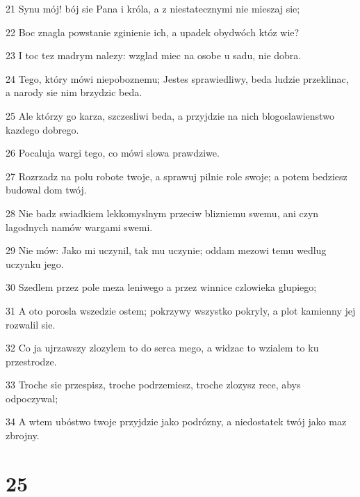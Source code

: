 \par 21 Synu mój! bój sie Pana i króla, a z niestatecznymi nie mieszaj sie;
\par 22 Boc znagla powstanie zginienie ich, a upadek obydwóch któz wie?
\par 23 I toc tez madrym nalezy: wzglad miec na osobe u sadu, nie dobra.
\par 24 Tego, który mówi niepoboznemu; Jestes sprawiedliwy, beda ludzie przeklinac, a narody sie nim brzydzic beda.
\par 25 Ale którzy go karza, szczesliwi beda, a przyjdzie na nich blogoslawienstwo kazdego dobrego.
\par 26 Pocaluja wargi tego, co mówi slowa prawdziwe.
\par 27 Rozrzadz na polu robote twoje, a sprawuj pilnie role swoje; a potem bedziesz budowal dom twój.
\par 28 Nie badz swiadkiem lekkomyslnym przeciw blizniemu swemu, ani czyn lagodnych namów wargami swemi.
\par 29 Nie mów: Jako mi uczynil, tak mu uczynie; oddam mezowi temu wedlug uczynku jego.
\par 30 Szedlem przez pole meza leniwego a przez winnice czlowieka glupiego;
\par 31 A oto porosla wszedzie ostem; pokrzywy wszystko pokryly, a plot kamienny jej rozwalil sie.
\par 32 Co ja ujrzawszy zlozylem to do serca mego, a widzac to wzialem to ku przestrodze.
\par 33 Troche sie przespisz, troche podrzemiesz, troche zlozysz rece, abys odpoczywal;
\par 34 A wtem ubóstwo twoje przyjdzie jako podrózny, a niedostatek twój jako maz zbrojny.

\chapter{25}

